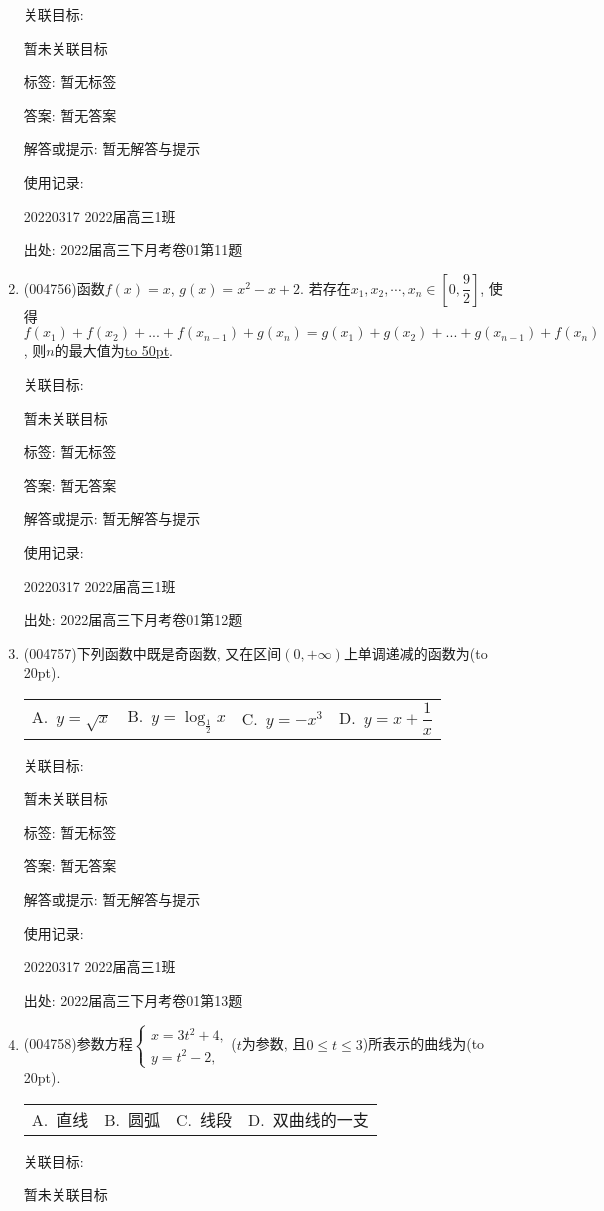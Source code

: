 \documentclass[10pt,a4paper]{article}
\newcommand{\blank}[1]{\underline{\hbox to #1pt{}}}
\newcommand{\bracket}[1]{(\hbox to #1pt{})}
\newcommand{\fourch}[4]{\par\begin{tabular}{p{.23\textwidth}p{.23\textwidth}p{.23\textwidth}p{.23\textwidth}}
A.~#1 &B.~#2& C.~#3& D.~#4
\end{tabular}}
\begin{document}
\begin{enumerate}[1.]
关联目标:

暂未关联目标



标签: 暂无标签

答案: 暂无答案

解答或提示: 暂无解答与提示

使用记录:

20220317	2022届高三1班	


出处: 2022届高三下月考卷01第11题
\item { (004756)}函数$f(x)=x$, $g(x)=x^2-x+2$. 若存在$x_1, x_2,\cdots,x_n\in [0,\dfrac 92]$, 使得$f(x_1)+f(x_2)+...+f(x_{n-1})+g(x_n)=g(x_1)+g(x_2)+...+g(x_{n-1})+f(x_n)$, 则$n$的最大值为\blank{50}.


关联目标:

暂未关联目标



标签: 暂无标签

答案: 暂无答案

解答或提示: 暂无解答与提示

使用记录:

20220317	2022届高三1班	


出处: 2022届高三下月考卷01第12题
\item { (004757)}下列函数中既是奇函数, 又在区间$(0,+\infty)$上单调递减的函数为\bracket{20}.
\fourch{$y=\sqrt x$}{$y=\log_{\frac 12}x$}{$y=-x^3$}{$y=x+\dfrac 1x$}


关联目标:

暂未关联目标



标签: 暂无标签

答案: 暂无答案

解答或提示: 暂无解答与提示

使用记录:

20220317	2022届高三1班	


出处: 2022届高三下月考卷01第13题
\item { (004758)}参数方程$\begin{cases} x=3t^2+4,\\ y=t^2-2, \end{cases}$($t$为参数, 且$0\le t\le 3$)所表示的曲线为\bracket{20}.
\fourch{直线}{圆弧}{线段}{双曲线的一支}


关联目标:

暂未关联目标




\end{enumerate}
\end{document}
